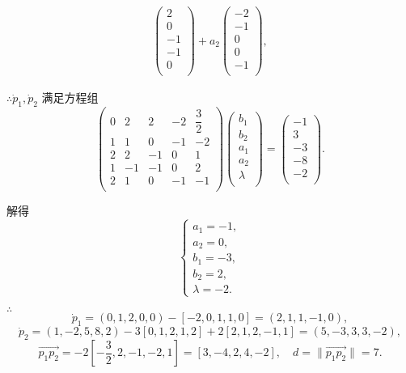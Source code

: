 \documentclass{ctexart}
\begin{document}
\begin{solution}
\begin{align*}
\begin{pmatrix}
            2 \\
            0 \\
            -1 \\
            -1 \\
            0 \\
        \end{pmatrix}+a_2\begin{pmatrix}
            -2 \\
            -1 \\
            0 \\
            0 \\
            -1 \\
        \end{pmatrix},
    \end{align*}

    $\therefore\dot{p}_1,\dot{p}_2$ 满足方程组
    \[\begin{pmatrix}
        0 & 2  & 2  & -2 & \dfrac{3}{2} \\
        1 & 1  & 0  & -1 & -2 \\
        2 & 2  & -1 & 0  & 1 \\
        1 & -1 & -1 & 0  & 2 \\
        2 & 1  & 0  & -1 & -1 \\
    \end{pmatrix}\begin{pmatrix}
        b_1 \\
        b_2 \\
        a_1 \\
        a_2 \\
        \lambda \\
    \end{pmatrix}=\begin{pmatrix}
        -1 \\
        3 \\
        -3 \\
        -8 \\
        -2 \\
    \end{pmatrix}.\]

    解得
    \[\begin{cases}
        a_1=-1, \\
        a_2=0, \\
        b_1=-3, \\
        b_2=2, \\
        \lambda=-2.
    \end{cases}\]

    $\therefore$
    \[\dot{p}_1=(0,1,2,0,0)-[-2,0,1,1,0]=(2,1,1,-1,0),\]
    \[\dot{p}_2=(1,-2,5,8,2)-3[0,1,2,1,2]+2[2,1,2,-1,1]=(5,-3,3,3,-2),\]
    \[\overrightarrow{p_1p_2}=-2\left[-\dfrac{3}{2},2,-1,-2,1\right]=[3,-4,2,4,-2],\quad d=\|\overrightarrow{p_1p_2}\|=7.\]
\end{solution}
\end{document}
